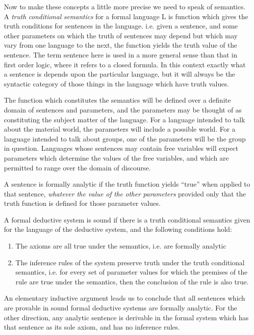 \documentclass{rbjk}
\begin{document}
\begin{article}
{Now to make these concepts a little more precise we need to speak of semantics.
A {\it truth conditional semantics} for a formal language L is function which gives the truth conditions for sentences in the language.
i.e. given a sentence, and some other parameters on which the truth of sentences may depend but which may vary from one language to the next, the function yields the truth value of the sentence.
The term sentence here is used in a more general sense than that in first order logic, where it refers to a closed formula.
In this context exactly what a sentence is depends upon the particular language, but it will always be the syntactic category of those things in the language which have truth values.

The function which constitutes the semantics will be defined over a definite domain of sentences and parameters, and the parameters may be thought of as constituting the subject matter of the language.
For a language intended to talk about the material world, the parameters will include a possible world.
For a language intended to talk about groups, one of the parameters will be the group in question.
Languages whose sentences may contain free variables will expect parameters which determine the values of the free variables, and which are permitted to range over the domain of discourse.

A sentence is formally analytic if the truth function yields ``true'' when applied to that sentence, {\it whatever the value of the other parameters} provided only that the truth function is defined for those parameter values.

A formal deductive system is sound if there is a truth conditional semantics given for the language of the deductive system, and the following conditions hold:

\begin{enumerate}
\item The axioms are all true under the semantics, i.e. are formally analytic
\item The inference rules of the system preserve truth under the truth conditional semantics, i.e. for every set of parameter values for which the premises of the rule are true under the semantics, then the conclusion of the rule is also true.
\end{enumerate}

An elementary inductive argument leads us to conclude that all sentences which are provable in sound formal deductive systems are formally analytic.
For the other direction, any analytic sentence is derivable in the formal system which has that sentence as its sole axiom, and has no inference rules.

}
\end{article}
\end{document}
